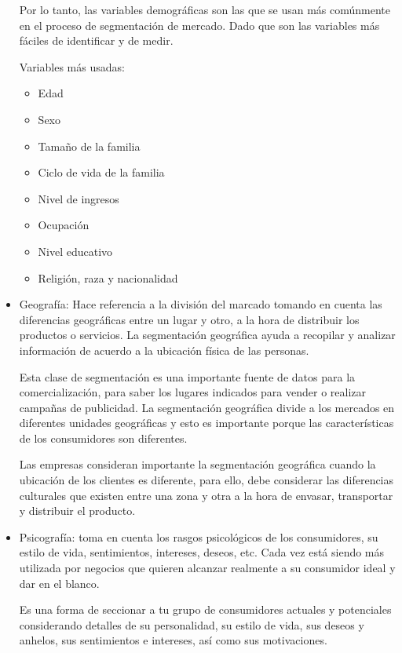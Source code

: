 \documentclass[letterpaper,12pt]{article}
\begin{document}
\begin{sloppypar}
\begin{itemize}
    Por lo tanto, las variables demográficas son las que se usan más comúnmente en el proceso de segmentación de mercado. Dado que son las variables más fáciles de identificar y de medir.
    
    Variables más usadas:
    \begin{itemize}
        \item Edad 
        \item Sexo 
        \item Tamaño de la familia
        \item Ciclo de vida de la familia 
        \item Nivel de ingresos
        \item Ocupación 
        \item Nivel educativo
        \item Religión, raza y nacionalidad
    \end{itemize}

    \item Geografía: Hace referencia a la división del marcado tomando en cuenta las diferencias geográficas entre un lugar y otro, a la hora de distribuir los productos o servicios. La segmentación geográfica ayuda a recopilar y analizar información de acuerdo a la ubicación física de las personas.
    
    Esta clase de segmentación es una importante fuente de datos para la comercialización, para saber los lugares indicados para vender o realizar campañas de publicidad. La segmentación geográfica divide a los mercados en diferentes unidades geográficas y esto es importante porque las características de los consumidores son diferentes.

    Las empresas consideran importante la segmentación geográfica cuando la ubicación de los clientes es diferente, para ello, debe considerar las diferencias culturales que existen entre una zona y otra a la hora de envasar, transportar y distribuir el producto.

    \item Psicografía: toma en cuenta los rasgos psicológicos de los consumidores, su estilo de vida, sentimientos, intereses, deseos, etc. Cada vez está siendo más utilizada por negocios que quieren alcanzar realmente a su consumidor ideal y dar en el blanco.

    Es una forma de seccionar a tu grupo de consumidores actuales y potenciales considerando detalles de su personalidad, su estilo de vida, sus deseos y anhelos, sus sentimientos e intereses, así como sus motivaciones.


\end{itemize}
\end{sloppypar}
\end{document}
